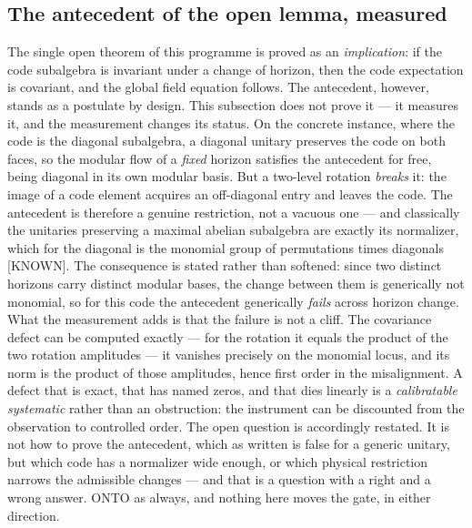 \documentclass[11pt]{article}
\theoremstyle{definition}\newtheorem{deriv}{Derivation}
\begin{document}
\subsection*{The antecedent of the open lemma, measured}The single open theorem of this programme is proved as an \emph{implication}: if the code subalgebra is invariant under a change of horizon, then the code expectation is covariant, and the global field equation follows. The antecedent, however, stands as a postulate by design. This subsection does not prove it --- it measures it, and the measurement changes its status. On the concrete instance, where the code is the diagonal subalgebra, a diagonal unitary preserves the code on both faces, so the modular flow of a \emph{fixed} horizon satisfies the antecedent for free, being diagonal in its own modular basis. But a two-level rotation \emph{breaks} it: the image of a code element acquires an off-diagonal entry and leaves the code. The antecedent is therefore a genuine restriction, not a vacuous one --- and classically the unitaries preserving a maximal abelian subalgebra are exactly its normalizer, which for the diagonal is the monomial group of permutations times diagonals \textsf{[KNOWN]}. The consequence is stated rather than softened: since two distinct horizons carry distinct modular bases, the change between them is generically not monomial, so for this code the antecedent generically \emph{fails} across horizon change. What the measurement adds is that the failure is not a cliff. The covariance defect can be computed exactly --- for the rotation it equals the product of the two rotation amplitudes --- it vanishes precisely on the monomial locus, and its norm is the product of those amplitudes, hence first order in the misalignment. A defect that is exact, that has named zeros, and that dies linearly is a \emph{calibratable systematic} rather than an obstruction: the instrument can be discounted from the observation to controlled order. The open question is accordingly restated. It is not how to prove the antecedent, which as written is false for a generic unitary, but which code has a normalizer wide enough, or which physical restriction narrows the admissible changes --- and that is a question with a right and a wrong answer. \textsf{ONTO} as always, and nothing here moves the gate, in either direction.
\end{document}
